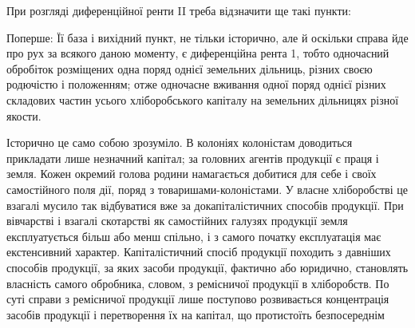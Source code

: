 При розгляді диференційної ренти II треба відзначити ще такі пункти:

Поперше: Її база і вихідний пункт, не тільки історично, але й оскільки
справа йде про рух за всякого даною моменту, є диференційна рента 1, тобто
одночасний обробіток розміщених одна поряд однієї земельних дільниць, різних
своєю родючістю і положенням; отже одночасне вживання одної поряд однієї
різних складових частин усього хліборобського капіталу на земельних дільницях
різної якости.

Історично це само собою зрозуміло. В колоніях колоністам доводиться прикладати
лише незначний капітал; за головних агентів продукції є праця і земля.
Кожен окремий голова родини намагається добитися для себе і своїх самостійного
поля дії, поряд з товаришами-колоністами. У власне хліборобстві це
взагалі мусило так відбуватися вже за докапіталістичних способів продукції. При
вівчарстві і взагалі скотарстві як самостійних галузях продукції земля експлуатується
більш або менш спільно, і з самого початку експлуатація має екстенсивний
характер. Капіталістичний спосіб продукції походить з давніших способів
продукції, за яких засоби продукції, фактично або юридично, становлять
власність самого обробника, словом, з ремісничої продукції в хліборобств. По
суті справи з ремісничої продукції лише поступово розвивається концентрація
засобів продукції і перетворення їх на капітал, що протистоїть безпосереднім
\parbreak{}  %
